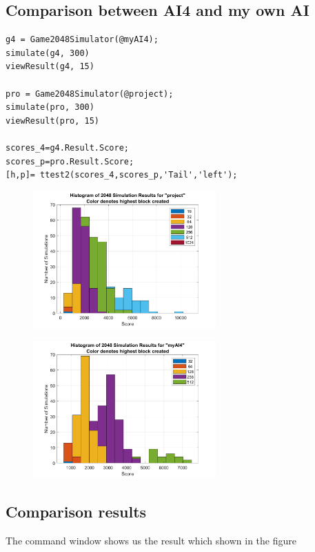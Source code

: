 \documentclass{article}
\begin{document}
\subsection{Comparison between AI4 and my own AI}
\begin{tcolorbox}
\begin{verbatim}
g4 = Game2048Simulator(@myAI4);
simulate(g4, 300)
viewResult(g4, 15)

pro = Game2048Simulator(@project);
simulate(pro, 300)
viewResult(pro, 15)

scores_4=g4.Result.Score;
scores_p=pro.Result.Score;
[h,p]= ttest2(scores_4,scores_p,'Tail','left');
\end{verbatim}
\end{tcolorbox}

\begin{figure}[h!]
\centering
\includegraphics[width=7cm]{project_score.png}
\label{fig:MyAI4 results}
\end{figure}

\begin{figure}[h!]
\centering
\includegraphics[width=7cm]{myAI4_score.png}
\label{fig:MyAI4 results}
\end{figure}

\subsection{Comparison results}
The command window shows us the result which shown in the figure
\end{document}
